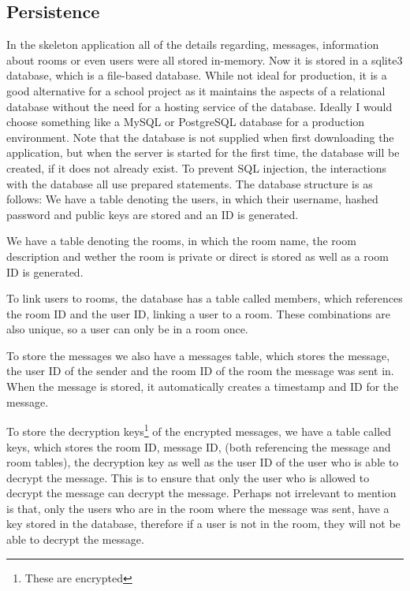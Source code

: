 \documentclass[a4paper]{article}
\begin{document}
\subsection{Persistence}
In the skeleton application all of the details regarding, messages, information about rooms or even users were all stored in-memory. Now it is stored in a sqlite3 database, which is a file-based database. While not ideal for production, it is a good alternative for a school project as it maintains the aspects of a relational database without the need for a hosting service of the database. Ideally I would choose something like a MySQL or PostgreSQL database for a production environment. Note that the database is not supplied when first downloading the application, but when the server is started for the first time, the database will be created, if it does not already exist. To prevent SQL injection, the interactions with the database all use prepared statements.
The database structure is as follows:
We have a table denoting the users, in which their username, hashed password and public keys are stored and an ID is generated.

We have a table denoting the rooms, in which the room name, the room description and wether the room is private or direct is stored as well as a room ID is generated.

To link users to rooms, the database has a table called members, which references the room ID and the user ID, linking a user to a room. These combinations are also unique, so a user can only be in a room once.

To store the messages we also have a messages table, which stores the message, the user ID of the sender and the room ID of the room the message was sent in. When the message is stored, it automatically creates a timestamp and ID for the message.

To store the decryption keys\footnote{These are encrypted} of the encrypted messages, we have a table called keys, which stores the room ID, message ID, (both referencing the message and room tables), the decryption key as well as the user ID of the user who is able to decrypt the message. This is to ensure that only the user who is allowed to decrypt the message can decrypt the message. Perhaps not irrelevant to mention is that, only the users who are in the room where the message was sent, have a key stored in the database, therefore if a user is not in the room, they will not be able to decrypt the message.
\end{document}
